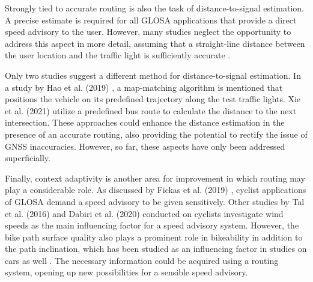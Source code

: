 Strongly tied to accurate routing is also the task of distance-to-signal estimation. A precise estimate is required for all GLOSA applications that provide a direct speed advisory to the user. However, many studies neglect the opportunity to address this aspect in more detail, assuming that a straight-line distance between the user location and the traffic light is sufficiently accurate \cite{iglesias_i2v_2008, katsaros_performance_2011, koukoumidis_signalguru_2011, koukoumidis_leveraging_2012, krause_traffic_2012, li_open_2012, stevanovic_green_2013, eckhoff_potentials_2013, tal_vehicular-communications-based_2016, bernais_design_2016, stebbins_characterising_2017, sharara_impact_2019}. 

Only two studies suggest a different method for distance-to-signal estimation. In a study by Hao et al. (2019) \cite{hao_eco-approach_2019}, a map-matching algorithm is mentioned that positions the vehicle on its predefined trajectory along the test traffic lights. Xie et al. (2021) \cite{xie_dynamic_2021} utilize a predefined bus route to calculate the distance to the next intersection. These approaches could enhance the distance estimation in the presence of an accurate routing, also providing the potential to rectify the issue of GNSS inaccuracies. However, so far, these aspects have only been addressed superficially.

Finally, context adaptivity is another area for improvement in which routing may play a considerable role. As discussed by Fickas et al. (2019) \cite{fickas_fast_2019}, cyclist applications of GLOSA demand a speed advisory to be given sensitively. Other studies by Tal et al. (2016) \cite{tal_vehicular-communications-based_2016} and Dabiri et al. (2020) \cite{dabiri_optimized_2020} conducted on cyclists investigate wind speeds as the main influencing factor for a speed advisory system. However, the bike path surface quality also plays a prominent role in bikeability \cite{wasserman_evaluating_2019} in addition to the path inclination, which has been studied as an influencing factor in studies on cars as well \cite{zhang_green_2020}. The necessary information could be acquired using a routing system, opening up new possibilities for a sensible speed advisory.

